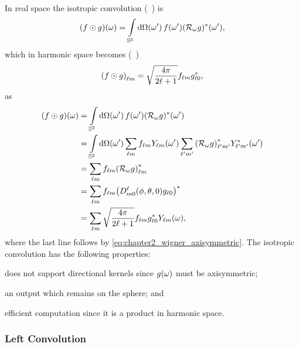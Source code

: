 In real space the isotropic convolution (\eg{}~\autocite{McEwen2007,Wei2011,Kennedy2011}) is
%
\begin{equation}
	\pixel{(f \odot g)}
	= \integrateSphere{\omega'} \pixel[']{f} \pixel[']{\conj{(\rotation{\omega}g)}},
\end{equation}
%
which in harmonic space becomes (\eg{}~\autocite{McEwen2007})
%
\begin{equation}\label{eq:chapter2_isotropic_harmonic}
	\harmonic{(f \odot g)}
	= \sqrt{\inverseFactor} \harmonic{f} \conj{\axiHarmonic{g}},
\end{equation}
%
as
%
\begin{align}
	\pixel{(f \odot g)}
	 & = \integrateSphere{\omega'} \pixel[']{f} \pixel[']{\conj{(\rotation{\omega}g)}} \nonumber{}                                                                                           \\
	 & = \integrateSphere{\omega'} \harmonicSum \harmonic{f} \pixel[']{\harmonic{Y}} \harmonicSum['] \conj{\harmonic[']{(\rotation{\omega}g)}} \pixel[']{\conj{\harmonic[']{Y}}} \nonumber{} \\
	 & = \harmonicSum \harmonic{f} \conj{\harmonic{(\rotation{\omega}g)}} \nonumber                                                                                                          \\
	 & = \harmonicSum \harmonic{f} \conj{\big(\wigner{\ell}{m}{0}(\phi,\theta,0) \axiHarmonic{g}\big)} \nonumber{}                                                                           \\
	 & = \harmonicSum \sqrt{\inverseFactor} \harmonic{f} \conj{\axiHarmonic{g}} \pixel{\harmonic{Y}},
\end{align}
%
where the last line follows by \cref{eq:chapter2_wigner_axisymmetric}.
The isotropic convolution has the following properties:
%
\begin{inparaenum}[(i)]
	\item does not support directional kernels since \(\pixel{g}\) must be axisymmetric;
	\item an output which remains on the sphere; and
	\item efficient computation since it is a product in harmonic space.
\end{inparaenum}

\subsubsection{Left Convolution}

